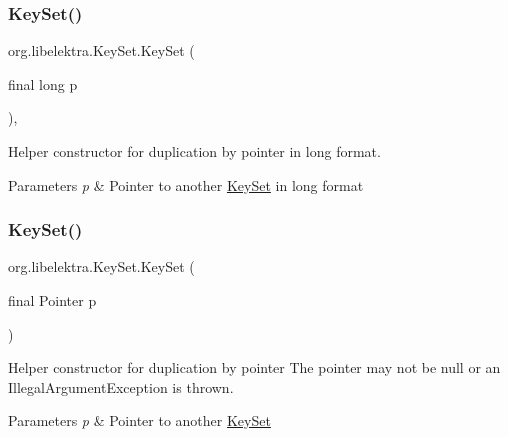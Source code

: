 \subsubsection{\texorpdfstring{Key\+Set()}{KeySet()}\hspace{0.1cm}{\footnotesize\ttfamily [1/2]}}
{\footnotesize\ttfamily org.\+libelektra.\+Key\+Set.\+Key\+Set (\begin{DoxyParamCaption}\item[{final long}]{p }\end{DoxyParamCaption})\hspace{0.3cm}{\ttfamily [inline]}, {\ttfamily [protected]}}



Helper constructor for duplication by pointer in long format. 


\begin{DoxyParams}{Parameters}
{\em p} & Pointer to another \hyperlink{classorg_1_1libelektra_1_1KeySet}{Key\+Set} in long format \\
\hline
\end{DoxyParams}
\mbox{\label{classorg_1_1libelektra_1_1KeySet_adf4ea02b31ed468e49c615f61ea57a15}} 
\subsubsection{\texorpdfstring{Key\+Set()}{KeySet()}\hspace{0.1cm}{\footnotesize\ttfamily [2/2]}}
{\footnotesize\ttfamily org.\+libelektra.\+Key\+Set.\+Key\+Set (\begin{DoxyParamCaption}\item[{final Pointer}]{p }\end{DoxyParamCaption})\hspace{0.3cm}{\ttfamily [inline]}}



Helper constructor for duplication by pointer The pointer may not be null or an Illegal\+Argument\+Exception is thrown. 


\begin{DoxyParams}{Parameters}
{\em p} & Pointer to another \hyperlink{classorg_1_1libelektra_1_1KeySet}{Key\+Set} \\
\hline
\end{DoxyParams}


